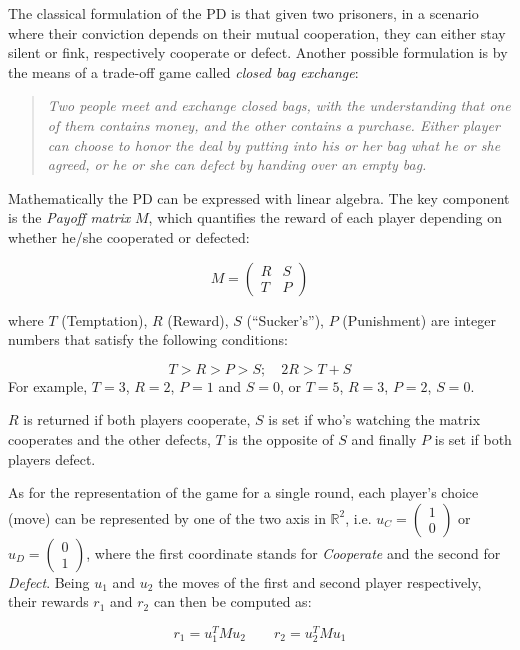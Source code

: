 \documentclass[journal,a4paper,10pt,twoside]{IEEEtran} %
\begin{document}
The classical formulation of the PD is that given two prisoners, in a scenario where their conviction depends on their mutual cooperation, they can either stay silent or fink, respectively cooperate or defect.
Another possible formulation is by the means of a trade-off game called \textit{closed bag exchange}:

\begin{quote}
\textit{Two people meet and exchange closed bags, with the understanding that one of them contains money, and the other contains a purchase. Either player can choose to honor the deal by putting into his or her bag what he or she agreed, or he or she can defect by handing over an empty bag.}
\end{quote}

Mathematically the PD can be expressed with linear algebra. The key component is the \textit{Payoff matrix} $M$, which quantifies the reward of each player depending on whether he/she cooperated or defected:

$$
M = 
\begin{pmatrix} 
R & S \\
T & P 
\end{pmatrix}
$$

where $T$ (Temptation), $R$ (Reward), $S$ (``Sucker's''), $P$ (Punishment) are integer numbers that satisfy the following conditions:

$$
T>R>P>S; \quad 2R > T+S 
$$
For example, $T=3$, $R=2$, $P=1$ and $S=0$, or  $T=5$, $R=3$, $P=2$, $S=0$. 

$R$ is returned if both players cooperate, $S$ is set if who's watching the matrix cooperates and the other defects, $T$ is the opposite of $S$ and finally $P$ is set if both players defect.

As for the representation of the game for a single round, each player's choice (move) can be represented by one of the two axis in $\mathbb{R}^2$, i.e. $u_C=\begin{pmatrix} 1 \\ 0 \end{pmatrix}$ or $u_D=\begin{pmatrix} 0 \\ 1 \end{pmatrix}$, where the first coordinate stands for \textit{Cooperate} and the second for \textit{Defect}. Being $u_1$ and $u_2$ the moves of the first and second player respectively, their rewards $r_1$ and $r_2$ can then be computed as:

$$
r_1 = u_1^T M u_2
\quad
\quad
r_2 = u_2^T M u_1
$$
\end{document}
